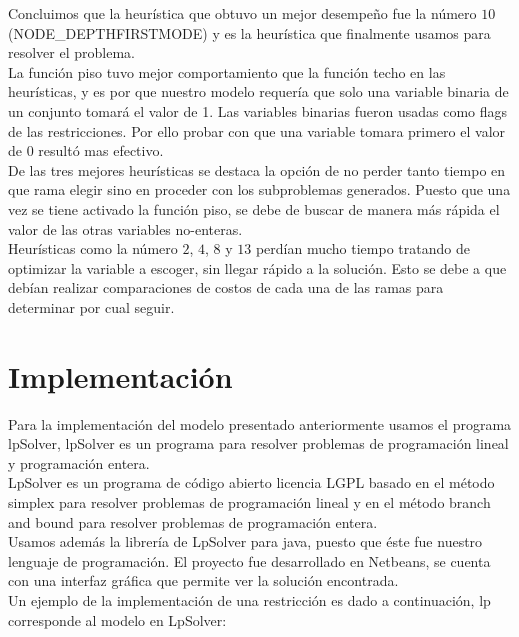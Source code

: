 \documentclass[10pt]{article}
\begin{document}
Concluimos que la heurística que obtuvo un mejor desempeño fue la número $10$ (NODE\_DEPTHFIRSTMODE) y es la heurística que finalmente usamos para resolver el problema.\\

La función piso tuvo mejor comportamiento que la función techo en las heurísticas, y es por que nuestro modelo requería que solo una variable binaria de un conjunto tomará el 
valor de 1. Las variables binarias fueron usadas como flags de las restricciones. Por ello probar con que una variable tomara primero el valor de $0$ resultó mas efectivo. \\

De las tres mejores heurísticas se destaca la opción de no perder tanto tiempo en que rama elegir sino en proceder con los subproblemas generados. Puesto que una vez se tiene activado
la función piso, se debe de buscar de manera más rápida el valor de las otras variables no-enteras.\\

Heurísticas como la número $2$, $4$, $8$ y $13$ perdían mucho tiempo tratando de optimizar la variable a escoger, sin llegar rápido a la solución. Esto se debe a que debían realizar
comparaciones de costos de cada una de las ramas para determinar por cual seguir.\\

\newpage
\section{Implementaci\'on}

Para la implementaci\'on del modelo presentado anteriormente usamos el programa lpSolver, lpSolver es un programa para resolver problemas de programación lineal y programación entera.\\

LpSolver es un programa de código abierto licencia LGPL basado en el método simplex para resolver problemas de programación lineal y en el método branch and bound para resolver problemas de programaci\'on entera.\\

Usamos además la librería de LpSolver para java, puesto que éste fue nuestro lenguaje de programación. El proyecto fue desarrollado en Netbeans, se cuenta con una interfaz gráfica que permite
ver la solución encontrada.\\

Un ejemplo de la implementación de una restricción es dado a continuación, lp corresponde al modelo en LpSolver:\\
\end{document}
